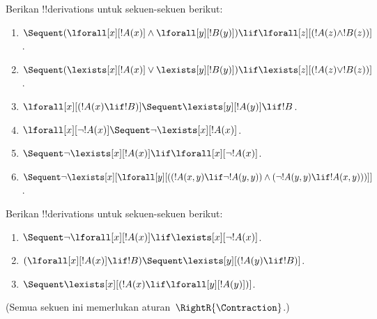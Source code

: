 \documentclass[../../../include/open-logic-section]{subfiles}
\begin{document}
\begin{prob}
Berikan !!{derivation}s untuk sekuen-sekuen berikut:
\begin{enumerate}
\item $\Sequent (\lforall[x][!A(x)] \land \lforall[y][!B(y)]) \lif
\lforall[z][(!A(z) \land !B(z))]$.
\item $\Sequent (\lexists[x][!A(x)] \lor \lexists[y][!B(y)]) \lif
\lexists[z][(!A(z) \lor !B(z))]$.
\item $\lforall[x][(!A(x) \lif !B)] \Sequent \lexists[y][!A(y)] \lif !B$.
\item $\lforall[x][\lnot !A(x)] \Sequent \lnot\lexists[x][!A(x)]$.
\item $\Sequent \lnot\lexists[x][!A(x)] \lif \lforall[x][\lnot !A(x)]$.
\item $\Sequent \lnot\lexists[x][\lforall[y][((!A(x,y) \lif \lnot
!A(y,y)) \land (\lnot !A(y,y) \lif !A(x,y)))]]$.
\end{enumerate}
\end{prob}

\begin{prob}
Berikan !!{derivation}s untuk sekuen-sekuen berikut:
\begin{enumerate}
\item $\Sequent \lnot\lforall[x][!A(x)] \lif \lexists[x][\lnot!A(x)]$.
\item $(\lforall[x][!A(x)] \lif !B) \Sequent \lexists[y][(!A(y) \lif !B)]$.
\item $\Sequent \lexists[x][(!A(x) \lif \lforall[y][!A(y)])]$.
\end{enumerate}
(Semua sekuen ini memerlukan aturan~$\RightR{\Contraction}$.)
\end{prob}
\end{document}
